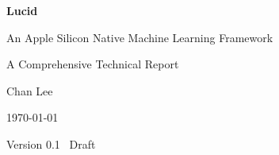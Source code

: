 \begin{titlingpage}
\thispagestyle{empty}
\vspace*{2cm}
\centering

{\fontsize{30pt}{36pt}\selectfont\bfseries\sffamily
  Lucid\par
}
\vspace{0.5em}

{\Large
  An Apple Silicon Native Machine Learning Framework\par
}

\vspace{0.3em}

{\large A Comprehensive Technical Report\par}

\vspace{5cm}

{\Large Chan Lee}\par
\vspace{0.5em}
{\large \today}\par

\vfill

{\small Version 0.1 \textperiodcentered\ Draft}\par

\end{titlingpage}
\clearpage
